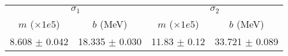 \begin{tabular}{cc|cc}
\multicolumn{2}{c|}{$\sigma_1$} & \multicolumn{2}{|c}{$\sigma_2$} \\
$m$ ($\times1e5$) & $b$ (MeV) & $m$ ($\times1e5$) & $b$ (MeV) \\
\hline
8.608 $\pm$ 0.042 & 18.335 $\pm$ 0.030 & 11.83 $\pm$ 0.12 & 33.721 $\pm$ 0.089\\
\end{tabular}
